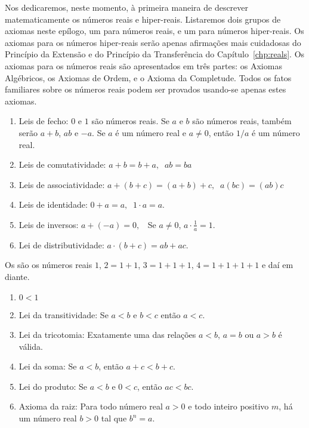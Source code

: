 Nos dedicaremos, neste momento, à primeira maneira de descrever
matematicamente os números reais e hiper-reais. Listaremos dois grupos
de axiomas neste epílogo, um para números reais, e um para números
hiper-reais. Os axiomas para os números hiper-reais serão apenas
afirmações mais cuidadosas do Princípio da Extensão e do Princípio
da Transferência do Capítulo~\ref{chp:reals}. Os axiomas para os
números reais são apresentados em três partes: os Axiomas Algébricos, os
Axiomas de Ordem, e o Axioma da Completude. Todos os fatos familiares
sobre os números reais podem ser provados usando-se apenas estes
axiomas.


\begin{enumerate}[A]
\item Leis de fecho: $0$ e $1$ são números reais. Se $a$ e $b$ são
      números reais, também serão $a+b$, $ab$ e $-a$. Se $a$ é um
      número real e $a \ne 0$, então $1/a$ é um número real.
\item Leis de comutatividade: $a+b = b + a, \; \; ab = ba$
\item Leis de associatividade: $a+(b+c) = (a+b) + c, \; \; a(bc) = (ab)c$
\item Leis de identidade: $0 + a = a, \; \; 1 \cdot a = a.$
\item Leis de inversos: $a+(-a) = 0, \; \;$ Se $a \ne 0$, $a \cdot \frac{1}{a} = 1.$
\item Lei de distributividade: $a \cdot (b+c) = ab + ac.$
\end{enumerate}

\begin{defin}
Os  são os números reais $1$, $2 = 1+1$,
$3 = 1+1+1$, $4 = 1+1+1+1$ e daí em diante.
\end{defin}


\begin{enumerate}[A]
\item $0 < 1$
\item Lei da transitividade: Se $a < b$ e $b < c$ então $a < c$.
\item Lei da tricotomia: Exatamente uma das relações $a < b$, $a = b$ ou $a > b$ é válida.
\item Lei da soma: Se $a < b$, então $a + c < b + c$.
\item Lei do produto: Se $a < b$ e $0 < c$, então $ac < bc$.
\item Axioma da raiz: Para todo número real $a > 0$ e todo inteiro positivo
      $m$, há um número real $b > 0$ tal que $b^n = a$.
\end{enumerate}

